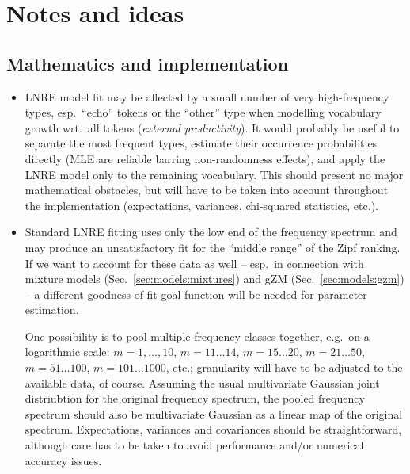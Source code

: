 \documentclass[a4paper]{article}
\begin{document}
\section{Notes and ideas}
\label{sec:notes}

\subsection{Mathematics and implementation}
\label{sec:notes:math}

\begin{itemize}

\item LNRE model fit may be affected by a small number of very high-frequency types, esp.\ ``echo'' tokens \citep{Baroni:Evert:07a} or the ``other'' type when modelling vocabulary growth wrt.\ all tokens (\emph{external productivity}).  It would probably be useful to separate the most frequent types, estimate their occurrence probabilities directly (MLE are reliable barring non-randomness effects), and apply the LNRE model only to the remaining vocabulary.  This should present no major mathematical obstacles, but will have to be taken into account throughout the implementation (expectations, variances, chi-squared statistics, etc.).

\item Standard LNRE fitting uses only the low end of the frequency spectrum and may produce an unsatisfactory fit for the ``middle range'' of the Zipf ranking.  If we want to account for these data as well -- esp.\ in connection with mixture models (Sec.~\ref{sec:models:mixtures}) and gZM (Sec.~\ref{sec:models:gzm}) -- a different goodness-of-fit goal function will be needed for parameter estimation.  

  One possibility is to pool multiple frequency classes together, e.g.\ on a logarithmic scale: $m=1,\ldots,10$, $m=11\ldots 14$, $m=15\ldots 20$, $m=21\ldots 50$, $m=51\ldots 100$, $m=101\ldots 1000$, etc.; granularity will have to be adjusted to the available data, of course.  Assuming the usual multivariate Gaussian joint distriubtion for the original frequency spectrum, the pooled frequency spectrum should also be multivariate Gaussian as a linear map of the original spectrum.  Expectations, variances and covariances should be straightforward, although care has to be taken to avoid performance and/or numerical accuracy issues.


\end{itemize}
\end{document}
